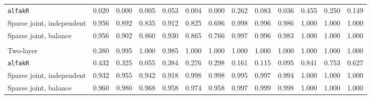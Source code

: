 \begin{center}
\begin{tabular}{l*{12}{r}}
\quad \texttt{alfakR} & 0.020 & 0.000 & 0.005 & 0.053 & 0.004 & 0.000 & 0.262 & 0.083 & 0.036 & 0.455 & 0.250 & 0.149 \\
\quad Sparse joint, independent & 0.956 & 0.892 & 0.835 & 0.912 & 0.825 & 0.696 & 0.998 & 0.996 & 0.986 & 1.000 & 1.000 & 1.000 \\
\quad Sparse joint, balance & 0.956 & 0.902 & 0.860 & 0.930 & 0.865 & 0.766 & 0.997 & 0.996 & 0.983 & 1.000 & 1.000 & 1.000 \\
\addlinespace[2pt]
\multicolumn{13}{l}{\textit{3000/100, 360 d}} \\
\quad Two-layer & 0.380 & 0.995 & 1.000 & 0.985 & 1.000 & 1.000 & 1.000 & 1.000 & 1.000 & 1.000 & 1.000 & 1.000 \\
\quad \texttt{alfakR} & 0.432 & 0.325 & 0.055 & 0.384 & 0.276 & 0.298 & 0.161 & 0.115 & 0.095 & 0.841 & 0.753 & 0.627 \\
\quad Sparse joint, independent & 0.932 & 0.955 & 0.942 & 0.918 & 0.998 & 0.998 & 0.995 & 0.997 & 0.994 & 1.000 & 1.000 & 1.000 \\
\quad Sparse joint, balance & 0.960 & 0.980 & 0.968 & 0.958 & 0.974 & 0.958 & 0.997 & 0.999 & 0.998 & 1.000 & 1.000 & 1.000 \\
\bottomrule
\end{tabular}
\end{center}

